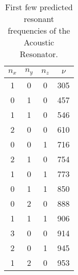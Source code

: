 \documentclass[10pt,a4paper,twocolumn]{article}
\begin{document}
\begin{table}
\centering
\captionsetup{justification=centering}
\begin{tabular}{|c|c|c|c|}
\hline
$n_x$ & $n_y$ & $n_z$ & $\nu$ \\ \hline \hline
1 & 0 & 0 & 305 \\ \hline
0 & 1 & 0 & 457 \\ \hline
1 & 1 & 0 & 546 \\ \hline
2 & 0 & 0 & 610 \\ \hline
0 & 0 & 1 & 716 \\ \hline
2 & 1 & 0 & 754 \\ \hline
1 & 0 & 1 & 773 \\ \hline
0 & 1 & 1 & 850 \\ \hline
0 & 2 & 0 & 888 \\ \hline
1 & 1 & 1 & 906 \\ \hline
3 & 0 & 0 & 914 \\ \hline
2 & 0 & 1 & 945 \\ \hline
1 & 2 & 0 & 953 \\ \hline
\end{tabular}
\caption{First few predicted resonant frequencies of the Acoustic Resonator.}
\label{tab:resonances}
\end{table}


\printbibliography
\end{document}

